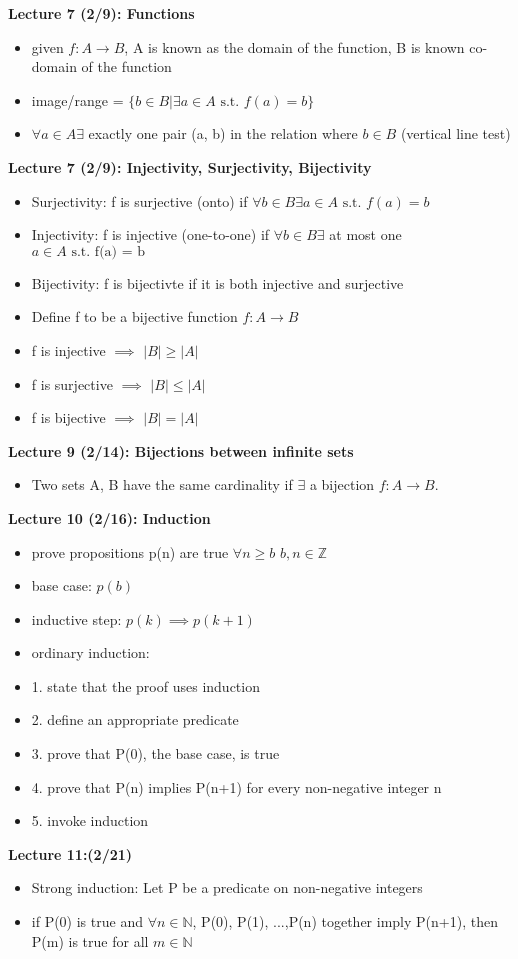 \documentclass[twocolumn]{article}
\begin{document}
\textbf{Lecture 7 (2/9): Functions}
\begin{itemize}
    \item given $f: A \rightarrow B$, A is known as the domain of the function, B is known co-domain of the function
    \item image/range = $
    \{ b \in B | \exists a \in A \text{ s.t. } f(a) = b\}$
    \item $\forall a \in A \exists$ exactly one pair (a, b) in the relation where $b \in B$ (vertical line test)
\end{itemize}

\textbf{Lecture 7 (2/9): Injectivity, Surjectivity, Bijectivity}
\begin{itemize}
    \item Surjectivity: f is surjective (onto) if $\forall b \in B \exists a \in A \text{ s.t. } f(a) = b$
    \item Injectivity: f is injective (one-to-one) if $\forall b \in B \exists$ at most one $a \in A \text{ s.t. f(a) = b}$
    \item Bijectivity: f is bijectivte if it is both injective and surjective
    \item Define f to be a bijective function $f: A \rightarrow B$
    \item f is injective $\implies$ $|B| \geq |A|$
    \item f is surjective $\implies$ $|B| \leq |A|$
    \item f is bijective $\implies$ $|B| = |A|$
\end{itemize}

\textbf{Lecture 9 (2/14): Bijections between infinite sets}
\begin{itemize}
    \item Two sets A, B have the same cardinality if $\exists$ a bijection $f: A \rightarrow B$.
\end{itemize}

\textbf{Lecture 10 (2/16): Induction}
\begin{itemize}
    \item prove propositions p(n) are true $\forall n \geq b$ $b, n \in \mathbb{Z}$
    \item base case: $p(b)$
    \item inductive step: $p(k) \implies p(k+1)$
    \item ordinary induction:
    \item 1. state that the proof uses induction
    \item 2. define an appropriate predicate
    \item 3. prove that P(0), the base case, is true
    \item 4. prove that P(n) implies P(n+1) for every non-negative integer n
    \item 5. invoke induction
\end{itemize}

\textbf{Lecture 11:(2/21)}
\begin{itemize}
    \item Strong induction: Let P be a predicate on non-negative integers
    \item if P(0) is true and $\forall n \in \mathbb{N}$, P(0), P(1), ...,P(n) together imply P(n+1), then P(m) is true for all $m \in \mathbb{N}$
\end{itemize}
\end{document}
